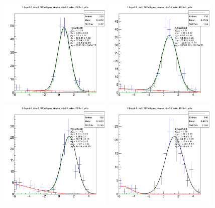 \begin{figure}\ContinuedFloat
    \centering
    \includegraphics[width=0.48\textwidth]{figures/Selected_Plots/1.5<p<2.0_AHe3_TPCnSigma_binsize_nS=0.5_rebin_DCA=1_pVtx.png}
    \includegraphics[width=0.48\textwidth]{figures/Selected_Plots/1.5<p<2.0_He3_TPCnSigma_binsize_nS=0.5_rebin_DCA=1_pVtx.png}
    \includegraphics[width=0.48\textwidth]{figures/Selected_Plots/2.0<p<4.0_AHe3_TPCnSigma_binsize_nS=0.5_rebin_DCA=1_pVtx.png}
    \includegraphics[width=0.48\textwidth]{figures/Selected_Plots/2.0<p<4.0_He3_TPCnSigma_binsize_nS=0.5_rebin_DCA=1_pVtx.png}

\end{figure}
